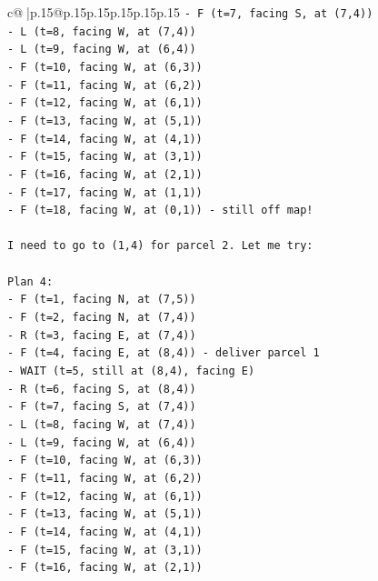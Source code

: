 \documentclass{article}
\begin{document}
{\begin{supertabular}{c@{$\;$}|p{.15\linewidth}@{}p{.15\linewidth}p{.15\linewidth}p{.15\linewidth}p{.15\linewidth}p{.15\linewidth}}
{{{\texttt{{-} F (t=7, facing S, at (7,4))} \\
\texttt{{-} L (t=8, facing W, at (7,4))} \\
\texttt{{-} L (t=9, facing W, at (6,4))} \\
\texttt{{-} F (t=10, facing W, at (6,3))} \\
\texttt{{-} F (t=11, facing W, at (6,2))} \\
\texttt{{-} F (t=12, facing W, at (6,1))} \\
\texttt{{-} F (t=13, facing W, at (5,1))} \\
\texttt{{-} F (t=14, facing W, at (4,1))} \\
\texttt{{-} F (t=15, facing W, at (3,1))} \\
\texttt{{-} F (t=16, facing W, at (2,1))} \\
\texttt{{-} F (t=17, facing W, at (1,1))} \\
\texttt{{-} F (t=18, facing W, at (0,1)) {-} still off map!} \\
\\ 
\texttt{I need to go to (1,4) for parcel 2. Let me try:} \\
\\ 
\texttt{Plan 4:} \\
\texttt{{-} F (t=1, facing N, at (7,5))} \\
\texttt{{-} F (t=2, facing N, at (7,4))} \\
\texttt{{-} R (t=3, facing E, at (7,4))} \\
\texttt{{-} F (t=4, facing E, at (8,4)) {-} deliver parcel 1} \\
\texttt{{-} WAIT (t=5, still at (8,4), facing E)} \\
\texttt{{-} R (t=6, facing S, at (8,4))} \\
\texttt{{-} F (t=7, facing S, at (7,4))} \\
\texttt{{-} L (t=8, facing W, at (7,4))} \\
\texttt{{-} L (t=9, facing W, at (6,4))} \\
\texttt{{-} F (t=10, facing W, at (6,3))} \\
\texttt{{-} F (t=11, facing W, at (6,2))} \\
\texttt{{-} F (t=12, facing W, at (6,1))} \\
\texttt{{-} F (t=13, facing W, at (5,1))} \\
\texttt{{-} F (t=14, facing W, at (4,1))} \\
\texttt{{-} F (t=15, facing W, at (3,1))} \\
\texttt{{-} F (t=16, facing W, at (2,1))} \\
}}}
\end{supertabular}}
\end{document}
